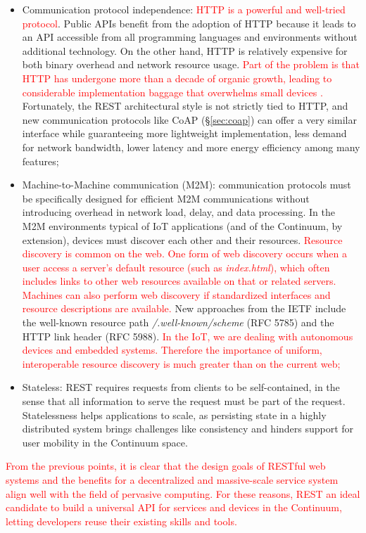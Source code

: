 \begin{itemize}
    \item Communication protocol independence: \textcolor{red}{HTTP is a powerful and well-tried protocol}. Public APIs benefit from the adoption of HTTP because it leads to an API accessible from all programming languages and environments without additional technology. On the other hand, HTTP is relatively expensive for both binary overhead and network resource usage. \textcolor{red}{Part of the problem is that HTTP has undergone more than a decade of organic growth, leading to considerable implementation baggage that overwhelms small devices \cite{bormann2012coap}.} Fortunately, the REST architectural style is not strictly tied to HTTP, and new communication protocols like CoAP (§\ref{sec:coap}) can offer a very similar interface while guaranteeing more lightweight implementation, less demand for network bandwidth, lower latency and more energy efficiency among many features;
    \item Machine-to-Machine communication (M2M): communication protocols must be specifically designed for efficient M2M communications without introducing overhead in network load, delay, and data processing. In the M2M environments typical of IoT applications (and of the Continuum, by extension), devices must discover each other and their resources. \textcolor{red}{Resource discovery is common on the web. One form of web discovery occurs when a user access a server's default resource (such as \emph{index.html}), which often includes links to other web resources available on that or related servers. Machines can also perform web discovery if standardized interfaces and resource descriptions are available.} New approaches from the IETF include the well-known resource path \emph{/.well-known/scheme} (RFC 5785) and the HTTP link header (RFC 5988). \textcolor{red}{In the IoT, we are dealing with autonomous devices and embedded systems. Therefore the importance of uniform, interoperable resource discovery is much greater than on the current web;}
    \item Stateless: REST requires requests from clients to be self-contained, in the sense that all information to serve the request must be part of the request. Statelessness helps applications to scale, as persisting state in a highly distributed system brings challenges like consistency and hinders support for user mobility in the Continuum space.
\end{itemize}

\textcolor{red}{From the previous points, it is clear that the design goals of RESTful web systems and the benefits for a decentralized and massive-scale service system align well with the field of pervasive computing. For these reasons, REST an ideal candidate to build a universal API for services and devices in the Continuum, letting developers reuse their existing skills and tools. }

